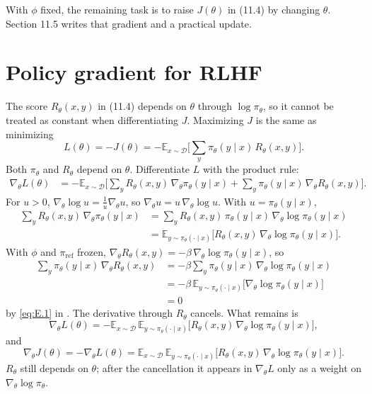 With $\phi$ fixed, the remaining task is to raise $J(\theta)$ in (11.4) by changing $\theta$. Section 11.5 writes that gradient and a practical update.

\section{Policy gradient for RLHF}

The score $R_\theta(x,y)$ in (11.4) depends on $\theta$ through $\log\pi_\theta$, so it cannot be treated as constant when differentiating $J$. Maximizing $J$ is the same as minimizing \[
L(\theta)
=
-J(\theta)
=
-
\mathbb{E}_{x\sim\mathcal{D}}
\Biggl[
\sum_y\pi_\theta(y\mid x)\,R_\theta(x,y)
\Biggr].
\] Both $\pi_\theta$ and $R_\theta$ depend on $\theta$. Differentiate $L$ with the product rule: \[
\begin{aligned}
\nabla_\theta L(\theta)
&=
-
\mathbb{E}_{x\sim\mathcal{D}}
\Biggl[
\sum_y R_\theta(x,y)\,\nabla_\theta\pi_\theta(y\mid x)
+
\sum_y\pi_\theta(y\mid x)\,\nabla_\theta R_\theta(x,y)
\Biggr].
\end{aligned}
\] For $u>0$, $\nabla_\theta\log u=\frac{1}{u}\nabla_\theta u$, so $\nabla_\theta u=u\,\nabla_\theta\log u$. With $u=\pi_\theta(y\mid x)$, \[
\begin{aligned}
\sum_y R_\theta(x,y)\,\nabla_\theta\pi_\theta(y\mid x)
&=
\sum_y R_\theta(x,y)\,\pi_\theta(y\mid x)\,\nabla_\theta\log\pi_\theta(y\mid x)
\\
&=
\mathbb{E}_{y\sim\pi_\theta(\cdot\mid x)}\bigl[R_\theta(x,y)\,\nabla_\theta\log\pi_\theta(y\mid x)\bigr].
\end{aligned}
\] With $\phi$ and $\pi_{\text{ref}}$ frozen, $\nabla_\theta R_\theta(x,y)=-\beta\,\nabla_\theta\log\pi_\theta(y\mid x)$, so \[
\begin{aligned}
\sum_y\pi_\theta(y\mid x)\,\nabla_\theta R_\theta(x,y)
&=
-\beta\sum_y\pi_\theta(y\mid x)\,\nabla_\theta\log\pi_\theta(y\mid x)
\\
&=
-\beta\,
\mathbb{E}_{y\sim\pi_\theta(\cdot\mid x)}\bigl[\nabla_\theta\log\pi_\theta(y\mid x)\bigr]
\\
&=
0
\end{aligned}
\] by \eqref{eq:E.1} in . The derivative through $R_\theta$ cancels. What remains is \[
\nabla_\theta L(\theta)
=
-
\mathbb{E}_{x\sim\mathcal{D}}\,
\mathbb{E}_{y\sim\pi_\theta(\cdot\mid x)}
\bigl[R_\theta(x,y)\,\nabla_\theta\log\pi_\theta(y\mid x)\bigr],
\] and \begin{equation}
\nabla_\theta J(\theta)
=
-\nabla_\theta L(\theta)
=
\mathbb{E}_{x\sim\mathcal{D}}\,
\mathbb{E}_{y\sim\pi_\theta(\cdot\mid x)}
\bigl[R_\theta(x,y)\,\nabla_\theta\log\pi_\theta(y\mid x)\bigr].
\tag{11.5}
\end{equation} $R_\theta$ still depends on $\theta$; after the cancellation it appears in $\nabla_\theta L$ only as a weight on $\nabla_\theta\log\pi_\theta$.

